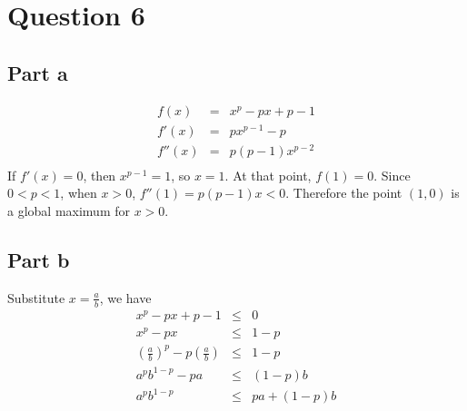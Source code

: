 \section*{Question 6}
\subsection*{Part a}
\begin{eqnarray*}
  f(x) &=& x^p - px + p - 1 \\
  f'(x) &=& px^{p-1} - p \\
  f''(x) &=& p(p-1)x^{p-2} \\
\end{eqnarray*}
If $ f'(x) = 0 $, then $ x^{p-1} = 1 $, so $ x = 1 $. At that point, $ f(1) = 0 $. Since $ 0 < p < 1 $, when $ x > 0 $, $ f''(1) = p(p-1)x < 0 $. Therefore the point $ (1, 0) $ is a global maximum for $ x > 0 $.
\subsection*{Part b}
Substitute $ x = \frac{a}{b} $, we have
\begin{eqnarray*}
  x^p - px + p - 1 &\le& 0 \\
  x^p - px &\le& 1 - p \\
  \left(\frac{a}{b}\right)^p - p\left(\frac{a}{b}\right) &\le& 1 - p \\
  a^pb^{1-p} - pa &\le& (1 - p)b \\
  a^pb^{1-p} &\le& pa + (1 - p)b 
\end{eqnarray*}